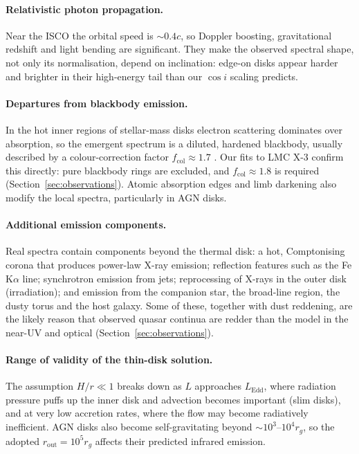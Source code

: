 \documentclass[11pt,a4paper]{article}
\newcommand{\LEdd}{L_{\mathrm{Edd}}}
\newcommand{\rout}{r_{\mathrm{out}}}
\newcommand{\rg}{r_{g}}
\begin{document}
\paragraph{Relativistic photon propagation.} Near the ISCO the orbital speed
is $\sim0.4c$, so Doppler boosting, gravitational redshift and light bending
are significant. They make the observed spectral shape, not only its
normalisation, depend on inclination: edge-on disks appear harder and
brighter in their high-energy tail than our $\cos i$ scaling predicts.

\paragraph{Departures from blackbody emission.} In the hot inner regions of
stellar-mass disks electron scattering dominates over absorption, so the
emergent spectrum is a diluted, hardened blackbody, usually described by a
colour-correction factor $f_{\mathrm{col}}\approx1.7$
\citep{ShimuraTakahara1995}. Our fits to LMC X-3 confirm this directly:
pure blackbody rings are excluded, and $f_{\mathrm{col}}\approx1.8$ is
required (Section~\ref{sec:observations}). Atomic absorption edges and limb
darkening also modify the local spectra, particularly in AGN disks.

\paragraph{Additional emission components.} Real spectra contain components
beyond the thermal disk: a hot, Comptonising corona that produces power-law
X-ray emission; reflection features such as the Fe\,K$\alpha$ line;
synchrotron emission from jets; reprocessing of X-rays in the outer disk
(irradiation); and emission from the companion star, the broad-line region,
the dusty torus and the host galaxy. Some of these, together with dust
reddening, are the likely reason that observed quasar continua are redder
than the model in the near-UV and optical (Section~\ref{sec:observations}).

\paragraph{Range of validity of the thin-disk solution.} The assumption
$H/r\ll1$ breaks down as $L$ approaches $\LEdd$, where radiation pressure
puffs up the inner disk and advection becomes important (slim disks), and at
very low accretion rates, where the flow may become radiatively inefficient.
AGN disks also become self-gravitating beyond $\sim10^3$--$10^4\rg$, so the
adopted $\rout=10^5\rg$ affects their predicted infrared emission.
\end{document}
